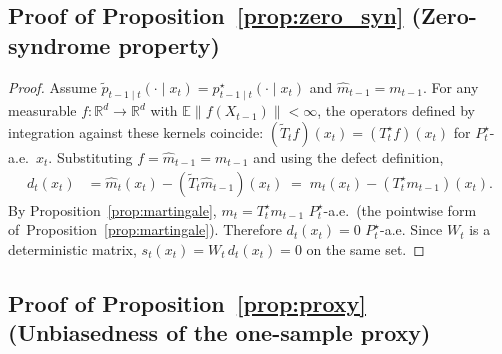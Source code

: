 \documentclass{article}
\theoremstyle{plain}
\theoremstyle{definition}
\theoremstyle{remark}
\begin{document}
\subsection{Proof of Proposition~\ref{prop:zero_syn}
            (Zero-syndrome property)}

\begin{proof}
Assume \(\tilde p_{t-1 \mid t}(\cdot\mid x_t) = p^\star_{t-1\mid t}(\cdot\mid
x_t)\) and \(\hat m_{t-1} = m_{t-1}\). For any measurable
\(f:\mathbb{R}^d\to\mathbb{R}^d\) with \(\mathbb{E}\|f(X_{t-1})\|<\infty\),
the operators defined by integration against these kernels coincide:
\((\tilde T_t f)(x_t) = (T_t^\star f)(x_t)\) for \(P_t^\star\)-a.e.\ \(x_t\).
Substituting \(f = \hat m_{t-1} = m_{t-1}\) and using the defect definition,
\begin{align*}
d_t(x_t)
&= \hat m_t(x_t) - (\tilde T_t \hat m_{t-1})(x_t)
\;=\; m_t(x_t) - (T_t^\star m_{t-1})(x_t).
\end{align*}
By Proposition~\ref{prop:martingale}, \(m_t = T_t^\star m_{t-1}\)
\(P_t^\star\)-a.e.\ (the pointwise form of~Proposition~\ref{prop:martingale}). Therefore
\(d_t(x_t) = 0\) \(P_t^\star\)-a.e. Since \(W_t\) is a deterministic matrix,
\(s_t(x_t) = W_t\,d_t(x_t) = 0\) on the same set.
\end{proof}

\subsection{Proof of Proposition~\ref{prop:proxy}
            (Unbiasedness of the one-sample proxy)}
\end{document}
